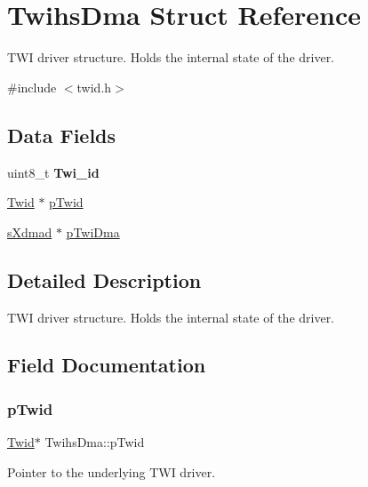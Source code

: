 \hypertarget{structTwihsDma}{}\section{Twihs\+Dma Struct Reference}
\label{structTwihsDma}


T\+WI driver structure. Holds the internal state of the driver.  




{\ttfamily \#include $<$twid.\+h$>$}

\subsection*{Data Fields}
\begin{DoxyCompactItemize}
\item 
\mbox{\label{structTwihsDma_a6da548d7bcc0dd3eecbeaf94dbb708f6}} 
uint8\+\_\+t {\bfseries Twi\+\_\+id}
\item 
\mbox{\hyperlink{struct__Twid}{Twid}} $\ast$ \mbox{\hyperlink{structTwihsDma_a107df8ccb56eba8d57e9c939f130544d}{p\+Twid}}
\item 
\mbox{\hyperlink{group__dmad__structs_gaf2c13151514615a6beb35c0d868a5053}{s\+Xdmad}} $\ast$ \mbox{\hyperlink{structTwihsDma_adc69bcfa8ca2d94a842d357ffe0041ec}{p\+Twi\+Dma}}
\end{DoxyCompactItemize}


\subsection{Detailed Description}
T\+WI driver structure. Holds the internal state of the driver. 

\subsection{Field Documentation}
\mbox{\label{structTwihsDma_a107df8ccb56eba8d57e9c939f130544d}} 
\subsubsection{\texorpdfstring{pTwid}{pTwid}}
{\footnotesize\ttfamily \mbox{\hyperlink{struct__Twid}{Twid}}$\ast$ Twihs\+Dma\+::p\+Twid}

Pointer to the underlying T\+WI driver. \mbox{\label{structTwihsDma_adc69bcfa8ca2d94a842d357ffe0041ec}} 

